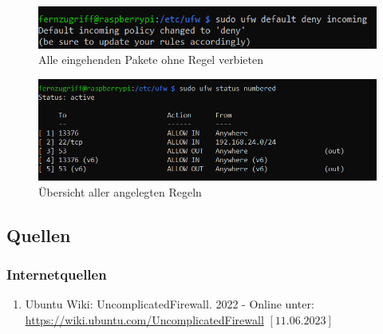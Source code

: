 \documentclass[a4paper, 11pt]{scrartcl}
\begin{document}
\begin{figure}[H]
    \begin{center}
        \includegraphics[scale=0.7]{Bilder/ufw_deny_all_incoming.png}
        \caption{Alle eingehenden Pakete ohne Regel verbieten}\label{pic:firewall_deny_default}
    \end{center}
\end{figure}

\begin{figure}[H]
    \begin{center}
        \includegraphics[scale=0.7]{Bilder/ufw_status_all_rules.png}
        \caption{Übersicht aller angelegten Regeln}\label{pic:firewall_status}
    \end{center}
\end{figure}





\subsection{Quellen}\label{ch:src}
\subsubsection{Internetquellen}\label{ch:src_internet}
\begin{enumerate}
    \item Ubuntu Wiki: UncomplicatedFirewall. 2022 - Online unter: \newline\url{https://wiki.ubuntu.com/UncomplicatedFirewall} $\left[\text{11.06.2023}\right]$\label{src:ufw}
\end{enumerate}
\begin{small}

\end{small}
\end{document}

